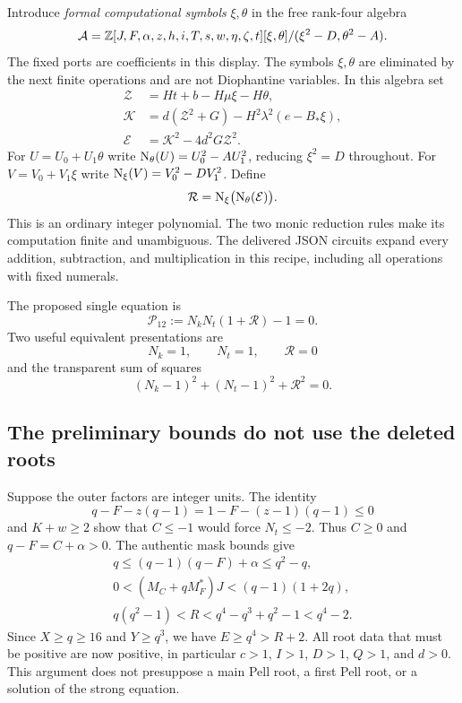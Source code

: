 Introduce \emph{formal computational symbols} $\xi,\theta$ in the
free rank-four algebra
\[
\mathcal A=\mathbb Z[J,F,\alpha,z,h,i,T,s,w,\eta,\zeta,t]
 [\xi,\theta]/(\xi^2-D,\theta^2-A).
\]
The fixed ports are coefficients in this display.  The symbols
$\xi,\theta$ are eliminated by the next finite operations and are
not Diophantine variables.
In this algebra set
\begin{align}
\mathcal Z&=Ht+b-H\mu\xi-H\theta,\nonumber\\
\mathcal K&=d(\mathcal Z^2+G)-H^2\lambda^2(e-B_*\xi),\nonumber\\
\mathcal E&=\mathcal K^2-4d^2G\mathcal Z^2.\label{eq:initialnorm}
\end{align}
For $U=U_0+U_1\theta$ write
$\operatorname{N}_\theta(U)=U_0^2-AU_1^2$, reducing $\xi^2=D$ throughout.
For $V=V_0+V_1\xi$ write
$\operatorname{N}_\xi(V)=V_0^2-DV_1^2$.  Define
\begin{equation}
\mathcal R=\operatorname{N}_\xi\bigl(\operatorname{N}_\theta(\mathcal E)\bigr).
\label{eq:fullnorm}
\end{equation}
This is an ordinary integer polynomial.  The two monic reduction rules
make its computation finite and unambiguous.  The delivered JSON
circuits expand every addition, subtraction, and multiplication in this
recipe, including all operations with fixed numerals.

The proposed single equation is
\begin{equation}
\boxed{\mathcal P_{12}:=N_kN_t(1+\mathcal R)-1=0.}
\label{eq:P12}
\end{equation}
Two useful equivalent presentations are
\begin{equation}
N_k=1,\qquad N_t=1,\qquad\mathcal R=0
\label{eq:system12}
\end{equation}
and the transparent sum of squares
\begin{equation}
(N_k-1)^2+(N_t-1)^2+\mathcal R^2=0.
\label{eq:sos12}
\end{equation}

\subsection{The preliminary bounds do not use the deleted roots}

Suppose the outer factors are integer units.  The identity
\[
q-F-z(q-1)=1-F-(z-1)(q-1)\le0
\]
and $K+w\ge2$ show that $C\le-1$ would force $N_t\le-2$.
Thus $C\ge0$ and $q-F=C+\alpha>0$.  The authentic mask bounds give
\begin{gather}
q\le(q-1)(q-F)+\alpha\le q^2-q,\nonumber\\
0<(M_C+qM_F^*)J<(q-1)(1+2q),\nonumber\\
q(q^2-1)<R<q^4-q^3+q^2-1<q^4-2.\label{eq:weakbounds}
\end{gather}
Since $X\ge q\ge16$ and $Y\ge q^3$, we have $E\ge q^4>R+2$.
All root data that must be positive are now positive, in particular
$c>1$, $I>1$, $D>1$, $Q>1$, and $d>0$.
This argument does not presuppose a main Pell root, a first Pell root,
or a solution of the strong equation.

